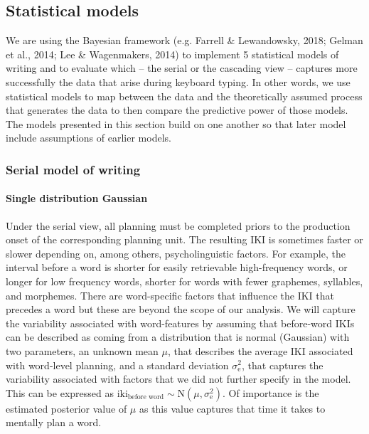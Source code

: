 \clearpage
\makeatletter
\efloat@restorefloats
\makeatother


\begin{appendix}
\section{}
\hypertarget{statistical-models}{%
\subsection{Statistical models}\label{statistical-models}}

We are using the Bayesian framework (e.g. Farrell \& Lewandowsky, 2018;
Gelman et al., 2014; Lee \& Wagenmakers, 2014) to implement 5
statistical models of writing and to evaluate which -- the serial or the
cascading view -- captures more successfully the data that arise during
keyboard typing. In other words, we use statistical models to map
between the data and the theoretically assumed process that generates
the data to then compare the predictive power of those models. The
models presented in this section build on one another so that later
model include assumptions of earlier models.

\hypertarget{serial-model-of-writing}{%
\subsubsection{Serial model of writing}\label{serial-model-of-writing}}

\hypertarget{single-distribution-gaussian}{%
\paragraph{Single distribution
Gaussian}\label{single-distribution-gaussian}}

Under the serial view, all planning must be completed priors to the
production onset of the corresponding planning unit. The resulting IKI
is sometimes faster or slower depending on, among others,
psycholinguistic factors. For example, the interval before a word is
shorter for easily retrievable high-frequency words, or longer for low
frequency words, shorter for words with fewer graphemes, syllables, and
morphemes. There are word-specific factors that influence the IKI that
precedes a word but these are beyond the scope of our analysis. We will
capture the variability associated with word-features by assuming that
before-word IKIs can be described as coming from a distribution that is
normal (Gaussian) with two parameters, an unknown mean \(\mu\), that
describes the average IKI associated with word-level planning, and a
standard deviation \(\sigma_\text{e}^2\), that captures the variability
associated with factors that we did not further specify in the model.
This can be expressed as
\(\text{iki}_\text{before word} \sim \text{N}(\mu, \sigma_\text{e}^2)\).
Of importance is the estimated posterior value of \(\mu\) as this value
captures that time it takes to mentally plan a word.


\end{appendix}
